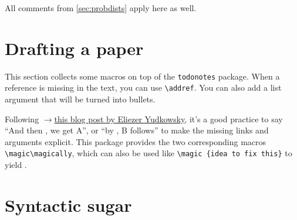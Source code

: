 \documentclass
[
twoside, %
]
{article}
\begin{document}
All comments from \cref{sec:probdists} apply here as well.

\section{Drafting a paper}
This section collects some macros on top of the \texttt{todonotes} package.
When a reference is missing in the text, you can use \texttt{\textbackslash addref}\addref.
You can also add a list argument that will be turned into bullets.

Following \href{http://lesswrong.com/lw/ix/say_not_complexity/}{$\rightarrow$this blog post by Eliezer Yudkowsky}, it's a good practice to say ``And then \magically, we get A'', or ``by \magic, B follows'' to make the missing links and arguments explicit.
This package provides the two corresponding macros \texttt{\textbackslash magic}\texttt{\textbackslash magically}, which can also be used like \texttt{\textbackslash magic \{idea to fix this\}} to yield .


\section{Syntactic sugar}
\end{document}
